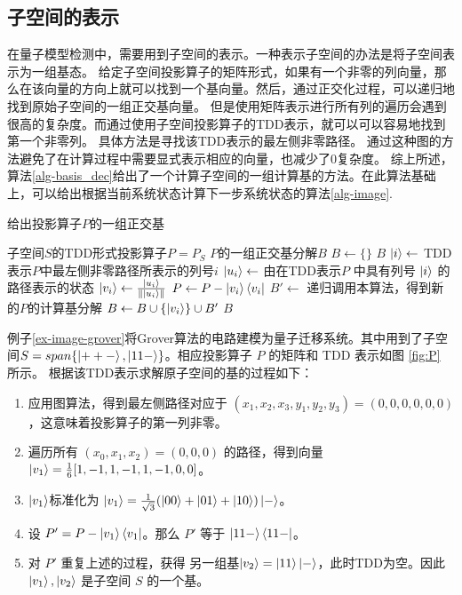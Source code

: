 \subsection*{子空间的表示}
在量子模型检测中，需要用到子空间的表示。一种表示子空间的办法是将子空间表示为一组基态。
给定子空间投影算子的矩阵形式，如果有一个非零的列向量，那么在该向量的方向上就可以找到一个基向量。然后，通过正交化过程，可以递归地找到原始子空间的一组正交基向量。
但是使用矩阵表示进行所有列的遍历会遇到很高的复杂度。而通过使用子空间投影算子的TDD表示，就可以可以容易地找到第一个非零列。
具体方法是寻找该TDD表示的最左侧非零路径。
通过这种图的方法避免了在计算过程中需要显式表示相应的向量，也减少了0复杂度​​。
综上所述，算法\ref{alg-basis_dec}给出了一个计算子空间的一组计算基的方法。在此算法基础上，可以给出根据当前系统状态计算下一步系统状态的算法\ref{alg-image}.
\begin{algorithm}
\caption{给出投影算子$P$的一组正交基}
\label{alg-basis_dec} 
\begin{algorithmic}[1]
    \Require 子空间$S$的TDD形式投影算子$P=P_S$ 
    \Ensure $P$的一组正交基分解$B$
    \State $B\gets \{\}$
        \Return \(B\)
    \Else
        \State \(\ket{i} \gets\) TDD表示\(P\)中最左侧非零路径所表示的列号\(i\)
        \State \(\ket{u_i}\gets\) 由在TDD表示\(P\) 中具有列号 \(\ket{i}\) 的路径表示的状态
        \State \(\ket{v_i} \gets \frac{\ket{u_i}}{\|\ket{u_i}\|}\)
        \State \(P \gets P - \ket{v_i}\bra{v_i}\)
        \State \(B' \gets \) 递归调用本算法，得到新的$P$的计算基分解
        \State \(B \gets B \cup \{\ket{v_i}\} \cup B'\)
    \EndIf
    \State \Return \(B\)
\end{algorithmic}
\end{algorithm}

\begin{example}
    \label{ex-image-sub}
    例子\ref{ex-image-grover}将Grover算法的电路建模为量子迁移系统。其中用到了子空间$S=span\{\ket{++-},\ket{11-}\}$。相应投影算子 $P$ 的矩阵和 TDD 表示如图 \ref{fig:P} 所示。
    根据该TDD表示求解原子空间的基的过程如下：
    \begin{enumerate}
        \item 应用图算法，得到最左侧路径对应于 $(x_1,x_2,x_3,y_1,y_2,y_3)=(0,0,0,0,0,0)$，这意味着投影算子的第一列非零。
        \item 遍历所有 $(x_0,x_1,x_2)=(0,0,0)$ 的路径，得到向量 $\ket{v_1}=\frac{1}{6}[1,-1,1,-1,1,-1,0,0]$。
        \item $\ket{v_1}$标准化为 $\ket{v_1}=\frac{1}{\sqrt{3}}(\ket{00}+\ket{01}+\ket{10})\ket{-}$。
        \item 设 $P'=P-\ket{v_1}\bra{v_1}$。那么 $P'$ 等于 $\ket{11-}\bra{11-}$。
        \item 对 $P'$ 重复上述的过程，获得 另一组基$\ket{v_2}=\ket{11}\ket{-}$，此时TDD为空。因此 ${\ket{v_1},\ket{v_2}}$ 是子空间 $S$ 的一个基。
    \end{enumerate}
\end{example}
